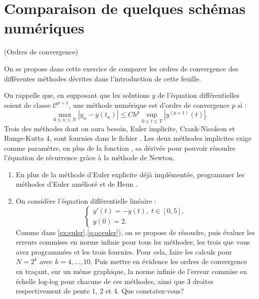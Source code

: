 \documentclass[a4paper,12pt,reqno]{amsart}
\begin{document}
\section{Comparaison  de quelques schémas numériques}


\begin{exo} (Ordres de convergence)

  On se propose dans cette exercice de comparer les ordres de convergence des différentes méthodes décrites dans l'introduction de cette feuille.

  On rappelle que, en supposant que les solutions $y$ de l'équation différentielles soient de classe ${\mathcal{C}}^{p+1}$, une méthode numérique est d'ordre de convergence $p$ si :
    $$
      \max_{0 \leq n \leq N} |y_n-y(t_n)|\leq C h^p \sup_{0 \leq t \leq T} |y^{(p+1)}(t)|.
    $$
  Trois des méthodes dont on aura besoin, Euler implicite, Crank-Nicolson et Runge-Kutta 4, sont fournies dans le fichier . Les deux méthodes implicites exige comme paramètre, en plus de la fonction , sa dérivée  pour pouvoir résoudre l'équation de récurrence grâce à la méthode de Newton.
  \begin{enumerate}
    \item
    En plus de la méthode d'Euler explicite déjà implémentée, programmer les méthodes d'Euler amélioré  et de Heun .
    \item On considère l'équation différentielle linéaire :
      $$
        \begin{cases}
          y'(t) = -y(t), \; t \in [0,5],\\
          y(0) = 2.
        \end{cases}
      $$
    Comme dans \ref{ex:euler}.\ref{q:oceuler}), on se propose de résoudre, puis évaluer les erreurs commises en norme infinie pour tous les méthodes, les trois que vous avez programmées et les trois fournies.
    Pour cela, faire les calculs pour $N=2^{k}$ avec $k=4,\dots,10$. Puis mettre en évidence  les ordres de convergence en traçant, sur un même graphique, la norme infinie de l'erreur commise en échelle \og{}log-log\fg{} pour chacune de ces méthodes, ainsi que 3 droites respectivement de pente $1$, $2$ et $4$.\newline
    Que constatez-vous?
  \end{enumerate}
\end{exo}
\end{document}
